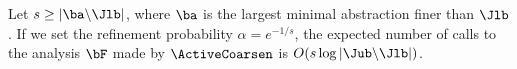 \begin{theorem}
\label{thm:activeCoarsen}
Let $s \ge |\ba \backslash \Jlb|$, where $\ba$ is
the largest minimal abstraction finer than $\Jlb$.
If we set the refinement probability $\alpha = e^{-1/s}$,
the expected number of calls to the analysis $\bF$ made by $\ActiveCoarsen$
is $O(s \log |\Jub \backslash \Jlb|)$.
\end{theorem}


